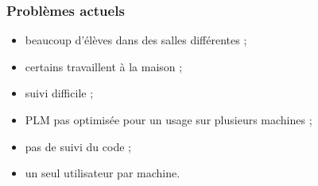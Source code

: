 \begin{frame}
		\tableofcontents[currentsection]
	\end{frame}
	\begin{frame}
	\frametitle{Problèmes actuels}
		\begin{itemize}
		\item beaucoup d'élèves dans des salles différentes ;
		\item certains travaillent à la maison ;
		\item suivi difficile ;
		\item PLM pas optimisée pour un usage sur plusieurs machines ;
		\item pas de suivi du code ;
		\item un seul utilisateur par machine.
		\end{itemize}
	\end{frame}